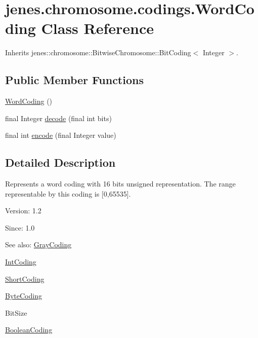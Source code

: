 \hypertarget{classjenes_1_1chromosome_1_1codings_1_1_word_coding}{
\section{jenes.chromosome.codings.WordCoding Class Reference}
\label{classjenes_1_1chromosome_1_1codings_1_1_word_coding}
}
Inherits jenes::chromosome::BitwiseChromosome::BitCoding$<$ Integer $>$.

\subsection*{Public Member Functions}
\begin{CompactItemize}
\item 
\hyperlink{classjenes_1_1chromosome_1_1codings_1_1_word_coding_d9cfa1bcd3dff5005c5fcbd3878777f5}{WordCoding} ()
\item 
final Integer \hyperlink{classjenes_1_1chromosome_1_1codings_1_1_word_coding_f92b18ee4d82fabeeadf6bb31a61bee6}{decode} (final int bits)
\item 
final int \hyperlink{classjenes_1_1chromosome_1_1codings_1_1_word_coding_867ca05daba5c08785ec92abc93c586d}{encode} (final Integer value)
\end{CompactItemize}


\subsection{Detailed Description}
Represents a word coding with 16 bits unsigned representation. The range representable by this coding is \mbox{[}0,65535\mbox{]}.

\begin{Desc}
\item[Version:]1.2 \end{Desc}
\begin{Desc}
\item[Since:]1.0\end{Desc}
\begin{Desc}
\item[See also:]\hyperlink{classjenes_1_1chromosome_1_1codings_1_1_gray_coding}{GrayCoding} 

\hyperlink{classjenes_1_1chromosome_1_1codings_1_1_int_coding}{IntCoding} 

\hyperlink{classjenes_1_1chromosome_1_1codings_1_1_short_coding}{ShortCoding} 

\hyperlink{classjenes_1_1chromosome_1_1codings_1_1_byte_coding}{ByteCoding} 

BitSize 

\hyperlink{classjenes_1_1chromosome_1_1codings_1_1_boolean_coding}{BooleanCoding} \end{Desc}


